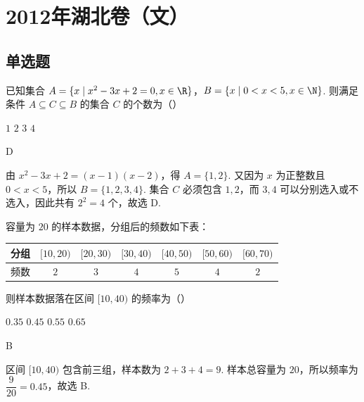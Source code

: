 \chapter{2012年湖北卷（文）}

\section{单选题}

\begin{problem}
已知集合 \(A = \{x \mid x^2 - 3x + 2 = 0, x \in \R\}\)，\(B = \{x \mid 0 < x < 5, x \in \N\}\). 则满足条件 \(A \subseteq C \subseteq B\) 的集合 \(C\) 的个数为（\quad）

\choices
    {\(1\)}
    {\(2\)}
    {\(3\)}
    {\(4\)}
\end{problem}

\begin{answer}
D
\end{answer}

\begin{solution}
由 \(x^{2}-3x+2=(x-1)(x-2)\)，得 \(A=\{1,2\}\). 又因为 \(x\) 为正整数且 \(0<x<5\)，所以 \(B=\{1,2,3,4\}\). 集合 \(C\) 必须包含 \(1,2\)，而 \(3,4\) 可以分别选入或不选入，因此共有 \(2^{2}=4\) 个，故选 D.
\end{solution}

\begin{problem}
容量为 \(20\) 的样本数据，分组后的频数如下表：

\begin{center}
\begin{tabular}{c|cccccc}
分组 & \([10,20)\) & \([20,30)\) & \([30,40)\) & \([40,50)\) & \([50,60)\) & \([60,70)\) \\
\hline
频数 & \(2\) & \(3\) & \(4\) & \(5\) & \(4\) & \(2\)
\end{tabular}
\end{center}

则样本数据落在区间 \([10,40)\) 的频率为（\quad）

\choices
    {\(0.35\)}
    {\(0.45\)}
    {\(0.55\)}
    {\(0.65\)}
\end{problem}

\begin{answer}
B
\end{answer}

\begin{solution}
区间 \([10,40)\) 包含前三组，样本数为 \(2+3+4=9\). 样本总容量为 \(20\)，所以频率为 \(\dfrac{9}{20}=0.45\)，故选 B.
\end{solution}

